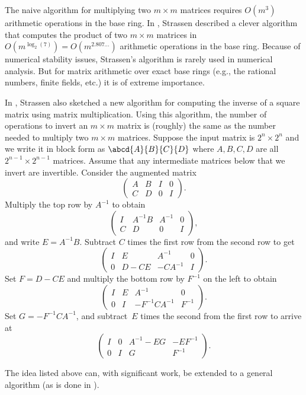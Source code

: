 The naive algorithm for multiplying two $m\times m$ matrices requires
$O(m^3)$ arithmetic operations in the base ring.  In
\cite{strassen:gauss}, Strassen described a clever algorithm that
computes the product of two $m\times m$ matrices in $O(m^{\log_2(7)})
= O(m^{2.807\ldots})$ arithmetic operations in the base ring.  Because
of numerical stability issues, Strassen's algorithm is rarely used in
numerical analysis.  But for matrix arithmetic over exact base rings
(e.g., the rational numbers, finite fields, etc.) it is of extreme
importance.

In \cite{strassen:gauss}, Strassen also sketched a new algorithm for
computing the inverse of a square matrix using matrix multiplication.
Using this algorithm, the number of operations to invert an $m\times m$ 
matrix is (roughly) the same as the number needed to multiply two
$m\times m$ matrices.
Suppose the input matrix is $2^n\times 2^n$ and we
write it in block form as $\abcd{A}{B}{C}{D}$ where $A,B,C,D$ are all
$2^{n-1}\times 2^{n-1}$ matrices.  Assume that any intermediate
matrices below that we invert are invertible.  Consider the augmented
matrix
$$
\left(\begin{array}{cc|cc}
A&B&I&0\\
C&D&0&I
\end{array}\right).
$$
Multiply the top row by $A^{-1}$ to obtain
$$
\left(\begin{array}{cc|cc}
I&A^{-1}B&A^{-1}&0\\
C&D&0&I
\end{array}\right),
$$
and write $E=A^{-1}B$.
Subtract $C$ times the first row from the second row to get
$$
\left(\begin{array}{cc|cc}
I&E&A^{-1}&0\\
0&D - CE &-CA^{-1}&I
\end{array}\right).
$$
Set $F=D-CE$ and multiply
the bottom row by $F^{-1}$ on the left to obtain
$$
\left(\begin{array}{cc|cc}
I&E&A^{-1}&0\\
0&I &-F^{-1}CA^{-1}&F^{-1}
\end{array}\right).
$$
Set $G=-F^{-1} C A^{-1}$, and subtract~$E$ 
times the second from the first row to
arrive at 
$$
\left(\begin{array}{cc|cc}
I&0&A^{-1}-EG&-EF^{-1}\\
0&I &G & F^{-1}
\end{array}\right).
$$

The idea listed above can, with significant work,
be extended to a general algorithm (as is done in \cite{sage}). 



